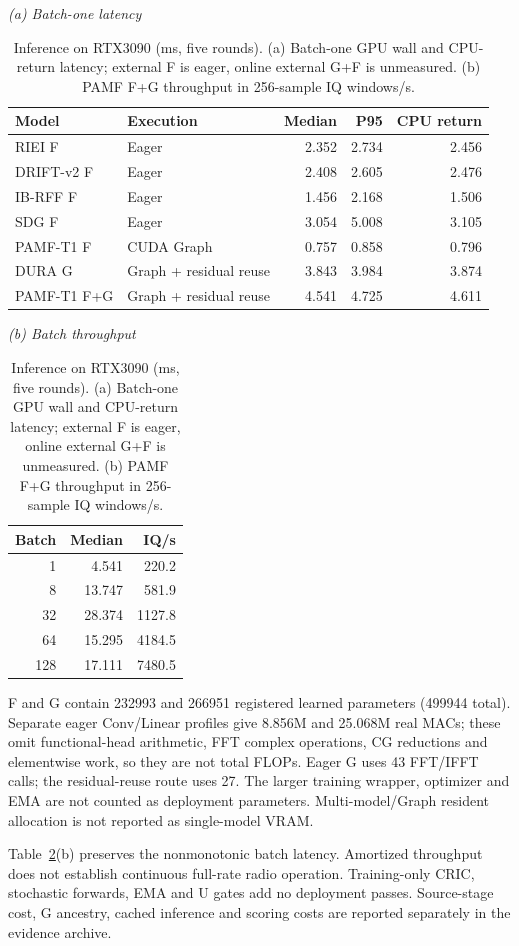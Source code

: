 \begin{table}[!t]\centering\footnotesize
\caption{Inference on RTX3090 (ms, five rounds). (a) Batch-one GPU wall and CPU-return latency; external F is eager, online external G+F is unmeasured. (b) PAMF F+G throughput in 256-sample IQ windows/s.}
\label{tab:paper-latency}
\begin{minipage}[t]{.71\textwidth}\centering
\textit{(a) Batch-one latency}\\[4pt]
\setlength{\tabcolsep}{3pt}
\begin{tabular*}{\linewidth}{@{\extracolsep{\fill}}llrrr@{}}\toprule
Model & Execution & Median & P95 & CPU return \\ \midrule
RIEI F & Eager & 2.352 & 2.734 & 2.456 \\
DRIFT-v2 F & Eager & 2.408 & 2.605 & 2.476 \\
IB-RFF F & Eager & 1.456 & 2.168 & 1.506 \\
SDG F & Eager & 3.054 & 5.008 & 3.105 \\
PAMF-T1 F & CUDA Graph & 0.757 & 0.858 & 0.796 \\
DURA G & Graph + residual reuse & 3.843 & 3.984 & 3.874 \\
PAMF-T1 F+G & Graph + residual reuse & 4.541 & 4.725 & 4.611 \\
\bottomrule\end{tabular*}\end{minipage}\hfill
\begin{minipage}[t]{.27\textwidth}\centering
\textit{(b) Batch throughput}\\[4pt]
\setlength{\tabcolsep}{3pt}
\begin{tabular*}{\linewidth}{@{\extracolsep{\fill}}rrr@{}}\toprule
Batch & Median & IQ/s \\ \midrule
1 & 4.541 & 220.2 \\
8 & 13.747 & 581.9 \\
32 & 28.374 & 1127.8 \\
64 & 15.295 & 4184.5 \\
128 & 17.111 & 7480.5 \\
\bottomrule\end{tabular*}\end{minipage}
\end{table}

F and G contain 232993 and 266951 registered learned parameters (499944 total). Separate eager Conv/Linear profiles give 8.856M and 25.068M real MACs; these omit functional-head arithmetic, FFT complex operations, CG reductions and elementwise work, so they are not total FLOPs. Eager G uses 43 FFT/IFFT calls; the residual-reuse route uses 27. The larger training wrapper, optimizer and EMA are not counted as deployment parameters. Multi-model/Graph resident allocation is not reported as single-model VRAM.

Table~\ref{tab:paper-latency}(b) preserves the nonmonotonic batch latency. Amortized throughput does not establish continuous full-rate radio operation. Training-only CRIC, stochastic forwards, EMA and U gates add no deployment passes. Source-stage cost, G ancestry, cached inference and scoring costs are reported separately in the evidence archive.
